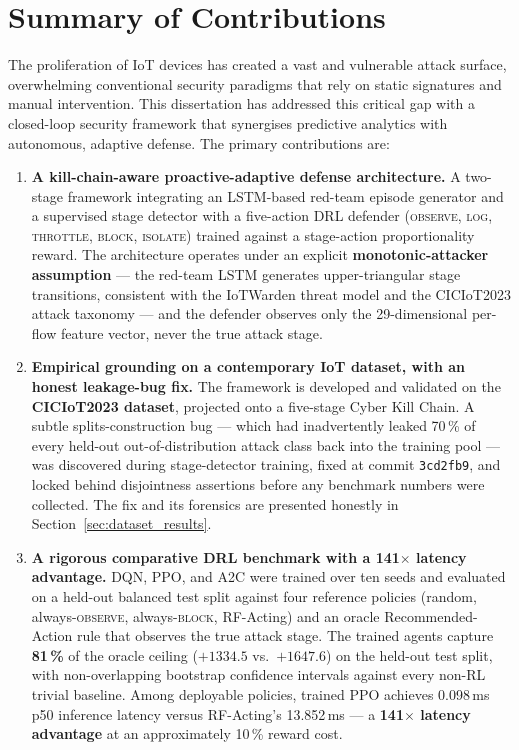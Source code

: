 \section{Summary of Contributions}\label{sec:summary}
The proliferation of IoT devices has created a vast and vulnerable attack surface, overwhelming conventional security paradigms that rely on static signatures and manual intervention. This dissertation has addressed this critical gap with a closed-loop security framework that synergises predictive analytics with autonomous, adaptive defense. The primary contributions are:
\begin{enumerate}
    \item \textbf{A kill-chain-aware proactive-adaptive defense architecture.} A two-stage framework integrating an LSTM-based red-team episode generator and a supervised stage detector with a five-action DRL defender (\textsc{observe}, \textsc{log}, \textsc{throttle}, \textsc{block}, \textsc{isolate}) trained against a stage-action proportionality reward. The architecture operates under an explicit \textbf{monotonic-attacker assumption} --- the red-team LSTM generates upper-triangular stage transitions, consistent with the IoTWarden threat model and the CICIoT2023 attack taxonomy --- and the defender observes only the 29-dimensional per-flow feature vector, never the true attack stage.

    \item \textbf{Empirical grounding on a contemporary IoT dataset, with an honest leakage-bug fix.} The framework is developed and validated on the \textbf{CICIoT2023 dataset}, projected onto a five-stage Cyber Kill Chain. A subtle splits-construction bug --- which had inadvertently leaked 70\,\% of every held-out out-of-distribution attack class back into the training pool --- was discovered during stage-detector training, fixed at commit \texttt{3cd2fb9}, and locked behind disjointness assertions before any benchmark numbers were collected. The fix and its forensics are presented honestly in Section~\ref{sec:dataset_results}.

    \item \textbf{A rigorous comparative DRL benchmark with a 141$\times$ latency advantage.} DQN, PPO, and A2C were trained over ten seeds and evaluated on a held-out balanced test split against four reference policies (random, always-\textsc{observe}, always-\textsc{block}, RF-Acting) and an oracle Recommended-Action rule that observes the true attack stage. The trained agents capture \textbf{81\,\%} of the oracle ceiling ($+1334.5$ vs.\ $+1647.6$) on the held-out test split, with non-overlapping bootstrap confidence intervals against every non-RL trivial baseline. Among deployable policies, trained PPO achieves 0.098\,ms p50 inference latency versus RF-Acting's 13.852\,ms --- a \textbf{141$\times$ latency advantage} at an approximately 10\,\% reward cost.


\end{enumerate}
